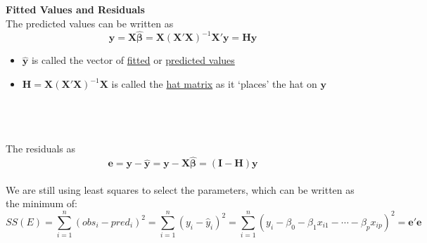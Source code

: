 \newpage

\Large \textbf{Fitted Values and Residuals}\large\\
The predicted values can be written as
$$\hat{\textbf{y}} = \textbf{X} \hat{\boldsymbol{\beta}} = \textbf{X} (\textbf{X}'\textbf{X})^{-1} \textbf{X}'\textbf{y} = \textbf{H} \textbf{y} $$
\begin{itemize}
\item $\hat{\textbf{y}}$ is called the vector of \underline{fitted} or \underline{predicted values}
\item $\textbf{H}=\textbf{X}(\textbf{X}'\textbf{X})^{-1}\textbf{X}$ is called the \underline{hat matrix} as it `places' the hat on $\textbf{y}$
\end{itemize}
~\\~\\~\\
The residuals as
$$\textbf{e}  =  \textbf{y}-\hat{\textbf{y}}  =  \textbf{y} - \textbf{X}\hat{\boldsymbol{\beta}} =  (\textbf{I}-\textbf{H}) \textbf{y}$$~\\

We are still using least squares to select the parameters, which can be written as the minimum of:
$$SS(E) = \sum_{i=1}^{n}(obs_i-pred_i)^2=\sum_{i=1}^n(y_i-\hat{y}_i)^2=\sum_{i=1}^n (y_i - \beta_0 - \beta_1 x_{i1} - \cdots - \beta_p x_{ip})^2=\textbf{e}'\textbf{e}$$

